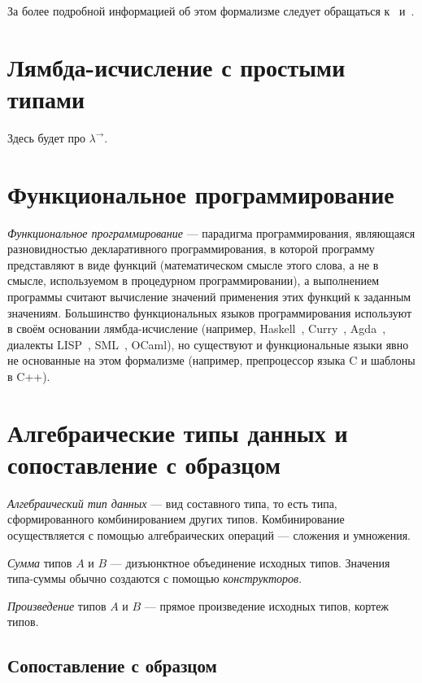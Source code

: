 За более подробной информацией об этом формализме следует обращаться к~\cite{TTFP} и~\cite{Sorensen}.

\section{Лямбда-исчисление с простыми типами}
Здесь будет про $\lambda^\to$.

\section{Функциональное программирование}

\emph{Функциональное программирование} — парадигма программирования,
являющаяся разновидностью декларативного программирования,
в которой программу представляют в виде функций
(математическом смысле этого слова, а не в смысле, используемом в процедурном программировании),
а выполнением программы считают вычисление значений применения этих функций к заданным значениям.
Большинство функциональных языков программирования используют в своём основании лямбда-исчисление
(например, Haskell~\cite{HaskellLang}, Curry~\cite{CurryLang}, Agda~\cite{AgdaLang},
диалекты LISP~\cite{SchemeLang,ClojureLang,SICP}, SML~\cite{SMLLang}, OCaml\cite{OCamlLang}),
но существуют и функциональные языки явно не основанные на этом формализме
(например, препроцессор языка C и шаблоны в C++).

\section{Алгебраические типы данных и сопоставление с образцом}


\emph{Алгебраический тип данных} — вид составного типа, то есть типа,
сформированного комбинированием других типов.
Комбинирование осуществляется с помощью алгебраических операций — сложения и умножения.

\emph{Сумма} типов $A$ и $B$ — дизъюнктное объединение исходных типов.
Значения типа-суммы обычно создаются с помощью \emph{конструкторов}.

\emph{Произведение} типов $A$ и $B$ — прямое произведение исходных типов,
кортеж типов.

\subsection{Сопоставление с образцом}

